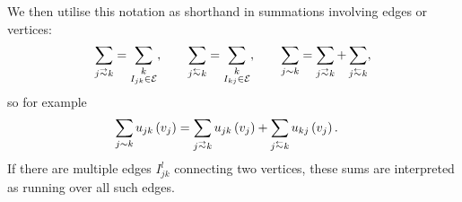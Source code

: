 We then utilise this notation as shorthand in summations involving edges or vertices:
\begin{align*}
	\sum_{j\conLeft k} = \sum_{\substack{k \\ I_{jk}\in \edgeSet}}, 
	\qquad 	\sum_{j\conRight k} = \sum_{\substack{k \\ I_{kj}\in \edgeSet}},
	\qquad \sum_{j\con k} = \sum_{j\conLeft k} + \sum_{j\conRight k},
\end{align*}
so for example
\begin{align*}
	\sum_{j\con k}u_{jk}\bracs{v_j} &= \sum_{j\conLeft k}u_{jk}\bracs{v_j} + \sum_{j\conRight k}u_{kj}\bracs{v_j}.
\end{align*}
If there are multiple edges $I_{jk}^l$ connecting two vertices, these sums are interpreted as running over all such edges.

